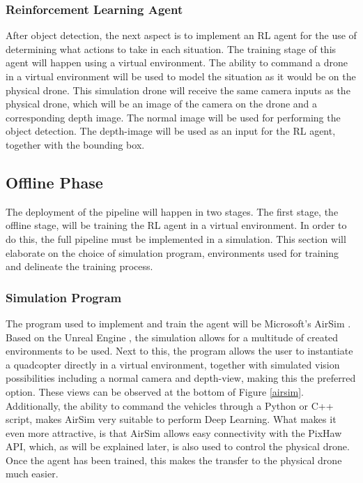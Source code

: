 \subsubsection{Reinforcement Learning Agent}
After object detection, the next aspect is to implement an RL agent for the use 
of determining what actions to take in each situation. The training stage of 
this agent will happen using a virtual environment. The ability to command a 
drone in a virtual environment will be used to model the situation as it would 
be on the physical drone. This simulation drone will receive the same camera inputs 
as the physical drone, which will be an image of the camera on the drone and a 
corresponding depth image. The normal image will be used for performing the object 
detection. The depth-image will be used as an input for the RL agent, together 
with the bounding box.

\subsection{Offline Phase}
The deployment of the pipeline will happen in two stages. The first stage, the offline 
stage, will be training the RL agent in a virtual environment. In order to do this, 
the full pipeline must be implemented in a simulation. This section will elaborate 
on the choice of simulation program, environments used for training and delineate the 
training process. 

\subsubsection{Simulation Program}
The program used to implement and train the agent will be Microsoft's  
AirSim \cite{airsim}. Based on the Unreal Engine \cite{unrealengine}, 
the simulation allows for a multitude of created environments to be used. Next 
to this, the program allows the user to instantiate a quadcopter directly in a 
virtual environment, together with simulated vision possibilities including a 
normal camera and depth-view, making this the preferred option. These views can 
be observed at the bottom of Figure \ref{airsim}. Additionally, the ability to 
command the vehicles through a Python or C++ script, makes AirSim very suitable 
to perform Deep Learning. What makes it even more attractive, is that AirSim allows 
easy connectivity with the PixHaw API, which, as will be explained later, is also 
used to control the physical drone. Once the agent has been trained, this makes 
the transfer to the physical drone much easier. 

